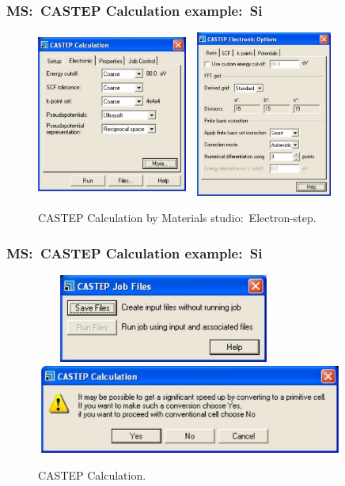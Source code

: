 \frame
{
	\frametitle{\textrm{MS:~CASTEP Calculation example:~Si}}
\begin{figure}[h!]
\centering
\vspace*{-0.10in}
\includegraphics[height=2.15in,width=1.95in,viewport=0 -50 650 700,clip]{Figures/MS-CASTEP-13-Si-Calculat-Electron-step.png}
\includegraphics[height=2.15in,width=1.95in,viewport=0 0 636 774,clip]{Figures/MS-CASTEP-13-Si-Calculat-Electron-detail.png}
\caption{\tiny \textrm{CASTEP Calculation by Materials studio:~Electron-step.}}%
\label{MS-CASTEP-Calculation-electron}
\end{figure}
}

\frame
{
	\frametitle{\textrm{MS:~CASTEP Calculation example:~Si}}
\begin{figure}[h!]
\centering
\includegraphics[height=1.15in,width=3.30in,viewport=0 0 1070 452,clip]{Figures/MS-CASTEP-03-Si-input-1.png}
\includegraphics[height=1.15in,width=4.00in,viewport=0 0 1070 355,clip]{Figures/MS-CASTEP-03-Si-input-2.png}
\caption{\tiny \textrm{CASTEP Calculation.}}%
\label{MS-CASTEP-Calculation-03}
\end{figure}
}

